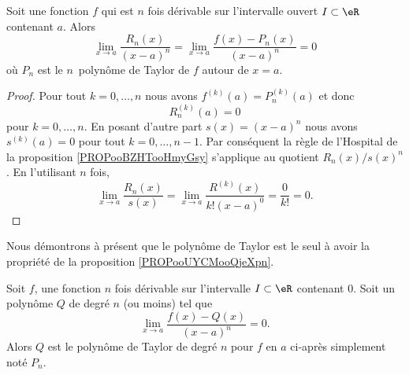 \begin{proposition}      \label{PROPooUYCMooQjeXpn}
	Soit une fonction \( f\) qui est \( n\) fois dérivable sur l'intervalle ouvert \( I\subset \eR\) contenant \( a\). Alors
	\begin{equation}
		\lim_{x\to a} \frac{ R_n(x) }{ (x-a)^n }=\lim_{x\to a} \frac{ f(x)-P_n(x) }{ (x-a)^n }=0
	\end{equation}
	où \( P_n\) est le \( n\)\ieme\ polynôme de Taylor de \( f\) autour de \( x=a\).
\end{proposition}

\begin{proof}
	Pour tout \( k=0,\ldots, n\) nous avons \( f^{(k)}(a)=P_n^{(k)}(a)\) et donc
	\begin{equation}
		R_n^{(k)}(a)=0
	\end{equation}
	pour \( k=0,\ldots, n\). En posant d'autre part \( s(x)=(x-a)^n\) nous avons \( s^{(k)}(a)=0\) pour tout \( k=0,\ldots, n-1\). Par conséquent la règle de l'Hospital de la proposition \ref{PROPooBZHTooHmyGsy} s'applique au quotient \( R_n(x)/s(x)^n\). En l'utilisant \( n\) fois,
	\begin{equation}
		\lim_{x\to a} \frac{ R_n(x) }{ s(x) }=\lim_{x\to a} \frac{ R^{(k)}(x) }{ k!(x-a)^0 }=\frac{ 0 }{ k! }=0.
	\end{equation}
\end{proof}

Nous démontrons à présent que le polynôme de Taylor est le seul à avoir la propriété de la proposition \ref{PROPooUYCMooQjeXpn}.
\begin{proposition}
	Soit \( f\), une fonction \( n\) fois dérivable sur l'intervalle \( I\subset \eR\) contenant \( 0\). Soit un polynôme \( Q\) de degré \( n\) (ou moins) tel que
	\begin{equation}    \label{EQooXPTIooOZqBaD}
		\lim_{x\to a} \frac{ f(x)-Q(x) }{ (x-a)^n  }=0.
	\end{equation}
	Alors \( Q\) est le polynôme de Taylor de degré \( n\) pour \( f\) en \( a\) ci-après simplement noté \( P_n\).
\end{proposition}

